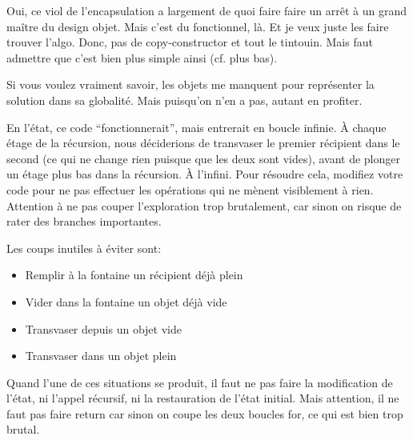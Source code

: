 \documentclass[10pt]{article}\usepackage[nu]{esial}%
\begin{document}
\begin{Reponse}
  Oui, ce viol de l'encapsulation a largement de quoi faire faire un arrêt à un
  grand maître du design objet. Mais c'est du fonctionnel, là. Et je veux juste
  les faire trouver l'algo. Donc, pas de copy-constructor et tout le
  tintouin. Mais faut admettre que c'est bien plus simple ainsi (cf. plus bas). 

  Si vous voulez vraiment savoir, les objets me manquent pour représenter la
  solution dans sa globalité. Mais puisqu'on n'en a pas, autant en profiter.
\end{Reponse}





\Question %
En l'état, ce code ``fonctionnerait'', mais entrerait en boucle infinie. À
chaque étage de la récursion, nous déciderions de transvaser le premier
récipient dans le second (ce qui ne change rien puisque que les deux sont
vides), avant de plonger un étage plus bas dans la récursion. À l'infini.  Pour
résoudre cela, modifiez votre code pour ne pas effectuer les opérations qui ne
mènent visiblement à rien. Attention à ne pas couper l'exploration trop
brutalement, car sinon on risque de rater des branches importantes.
\begin{Reponse}
  Les coups inutiles à éviter sont: 
  \begin{itemize}
  \item Remplir à la fontaine un récipient déjà plein
  \item Vider dans la fontaine un objet déjà vide
  \item Transvaser depuis un objet vide
  \item Transvaser dans un objet plein
  \end{itemize}
  Quand l'une de ces situations se produit, il faut ne pas faire la modification
  de l'état, ni l'appel récursif, ni la restauration de l'état initial. Mais
  attention, il ne faut pas faire return car sinon on coupe les deux boucles
  for, ce qui est bien trop brutal.
\end{Reponse}
\end{document}

